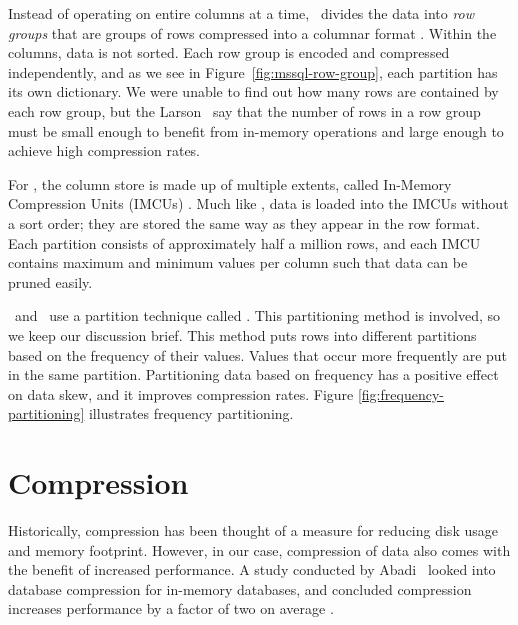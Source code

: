 Instead of operating on entire columns at a time, \mssql~divides the data into \textit{row groups} that are groups of rows compressed into a columnar format \cite{Larson2013-mc}. Within the columns, data is not sorted. Each row group is encoded and compressed independently, and as we see in Figure~\ref{fig:mssql-row-group}, each partition has its own dictionary. We were unable to find out how many rows are contained by each row group, but the Larson \ea~say that the number of rows in a row group must be small enough to benefit from in-memory operations and large enough to achieve high compression rates. 

For \oracle, the column store is made up of multiple extents, called In-Memory Compression Units (IMCUs) \cite{Lahiri2015-mz}. Much like \mssql, data is loaded into the IMCUs without a sort order; they are stored the same way as they appear in the row format. Each partition consists of approximately half a million rows, and each IMCU contains maximum and minimum values per column such that data can be pruned easily. 


\blink~and \ibm~use a partition technique called  \cite{Barber2012-xt, Raman2008-gi, Raman2013-em}. This partitioning method is involved, so we keep our discussion brief. This method puts rows into different partitions based on the frequency of their values. Values that occur more frequently are put in the same partition. Partitioning data based on frequency has a positive effect on data skew, and it improves compression rates. Figure \ref{fig:frequency-partitioning} illustrates frequency partitioning. 

\section{Compression}
\label{sec:Compression}
Historically, compression has been thought of a measure for reducing disk usage and memory footprint. However, in our case, compression of data also comes with the benefit of increased performance. A study conducted by Abadi \ea~looked into database compression for in-memory databases, and concluded compression increases performance by a factor of two on average \cite{Abadi2008-dd}.

